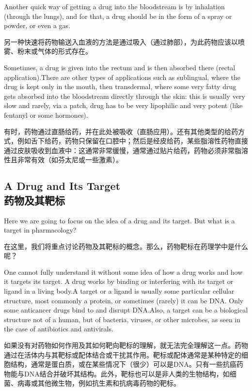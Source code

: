 \documentclass[dvipsnames, svgnames,a4paper,11pt]{article}
\begin{document}
Another quick way of getting a drug into the bloodstream is by inhalation (through the lungs), and for that, a drug should be in the form of a spray or powder, or even a gas.

另一种快速将药物输送入血液的方法是通过吸入（通过肺部），为此药物应该以喷雾、粉末或气体的形式存在。

Sometimes, a drug is given into the rectum and is then absorbed there (rectal application).There are other types of applications such as sublingual, where the drug is kept only in the mouth, then transdermal, where some very fatty drug gets absorbed into the bloodstream directly through the skin: this is usually very slow and rarely, via a patch, drug has to be very lipophilic and very potent (like fentanyl or some hormones).

有时，药物通过直肠给药，并在此处被吸收（直肠应用）。还有其他类型的给药方式，例如舌下给药，药物只保留在口腔中；然后是经皮给药，某些脂溶性药物直接通过皮肤吸收到血液中：这通常非常缓慢，通常通过贴片给药，药物必须非常脂溶性且非常有效（如芬太尼或一些激素）。

\subsection{A Drug and Its Target\\药物及其靶标}

Here we are going to focus on the idea of a drug and its target. But what is a target in pharmacology?

在这里，我们将重点讨论药物及其靶标的概念。那么，药物靶标在药理学中是什么呢？

One cannot fully understand it without some idea of how a drug works and how it targets its target. A drug works by binding or interfering with its target or ligand in a living body.A target or a ligand is usually some particular cellular structure, most commonly a protein, or sometimes (rarely) it can be DNA. Only some anticancer drugs bind to and disrupt DNA.Also, a target can be a biological structure not of a human, but of bacteria, viruses, or other microbes, as seen in the case of antibiotics and antivirals.


如果没有对药物如何作用及其如何靶向靶标的理解，就无法完全理解这一点。药物通过在活体内与其靶标或配体结合或干扰其作用。靶标或配体通常是某种特定的细胞结构，通常是蛋白质，或在某些情况下（很少）可以是DNA。只有一些抗癌药物能与DNA结合并破坏其结构。此外，靶标也可以是非人类的生物结构，如细菌、病毒或其他微生物，例如抗生素和抗病毒药物的靶标。
\end{document}
